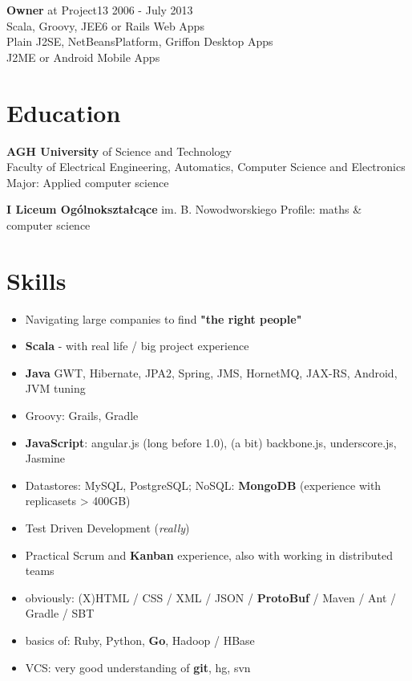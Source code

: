 \documentclass{res}
\begin{document}
\begin{resume}
{\bf Owner} at Project13                              \hfill 2006 - July 2013\\
	Scala, Groovy, JEE6 or Rails Web Apps \\
	Plain J2SE, NetBeansPlatform, Griffon Desktop Apps \\
	J2ME or Android Mobile Apps 

\section{Education} 
{\bf AGH University} of Science and Technology\\ 
	Faculty of Electrical Engineering, Automatics, Computer Science and Electronics\\
	Major: Applied computer science

{\bf I Liceum Ogólnokształcące} im. B. Nowodworskiego 
	Profile: maths \& computer science

\section{Skills}
\begin{itemize}
 \item Navigating large companies to find \textbf{"the right people"}
 \item \textbf{Scala} - with real life / big project experience
 \item \textbf{Java} GWT, Hibernate, JPA2, Spring, JMS, HornetMQ, JAX-RS, Android, JVM tuning
 \item Groovy: Grails, Gradle
 \item \textbf{JavaScript}: angular.js (long before 1.0), (a bit) backbone.js, underscore.js, Jasmine
 \item Datastores: MySQL, PostgreSQL; NoSQL: \textbf{MongoDB} (experience with replicasets > 400GB)
 \item Test Driven Development (\textit{really})
 \item Practical Scrum and \textbf{Kanban} experience, also with working in distributed teams
 \item obviously: (X)HTML / CSS / XML / JSON / \textbf{ProtoBuf} / Maven / Ant / Gradle / SBT
 \item basics of: Ruby, Python, \textbf{Go}, Hadoop / HBase
 \item VCS: very good understanding of \textbf{git}, hg, svn
\end{itemize}


\end{resume}
\end{document}
